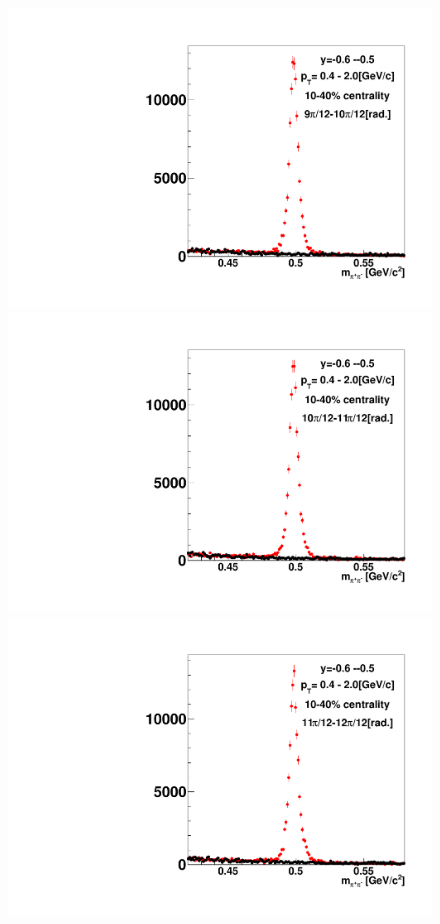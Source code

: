 \begin{figure}[h]
\includegraphics[width=0.14\linewidth]{chapterX/fig/ks_v1_sig/kf_ptslice0_cent1_ks_flow_phi10_rap10_check.pdf}
\includegraphics[width=0.14\linewidth]{chapterX/fig/ks_v1_sig/kf_ptslice0_cent1_ks_flow_phi11_rap10_check.pdf}
\includegraphics[width=0.14\linewidth]{chapterX/fig/ks_v1_sig/kf_ptslice0_cent1_ks_flow_phi12_rap10_check.pdf}


\end{figure}
